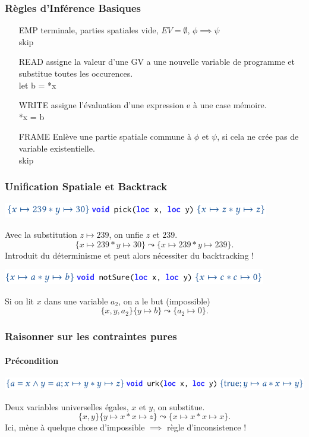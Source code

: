 \documentclass[french]{beamer}
\begin{document}
\begin{frame}
	\frametitle{Règles d'Inférence Basiques}
	\begin{itemize}
		\item[EMP] terminale, parties spatiales vide, $EV = \emptyset$, $\phi \implies \psi$ \\ skip
		\item[READ] assigne la valeur d'une GV a une nouvelle variable de programme et substitue toutes les occurences.\\
		let b = *x
		\item[WRITE] assigne l'évaluation d'une expression e à une case mémoire.\\
		*x = b 
		\item[FRAME] Enlève une partie spatiale commune à $\phi$ et $\psi$, si cela ne crée pas de variable existentielle.\\
		skip
	\end{itemize}
\end{frame}
\begin{frame}[fragile]
	\frametitle{Unification Spatiale et Backtrack}
   \includegraphics[height=\baselineskip]{figures/spatial_unification.png}
   
   Avec la substitution $z \mapsto 239$, on unfie $z$ et $239$. 
   \[ 
      \{x \mapsto 239 * y \mapsto 30\} \leadsto \{x \mapsto 239 * y \mapsto 239\}.
   \]
   Introduit du déterminisme et peut alors nécessiter du backtracking !
   
   \includegraphics[height=\baselineskip]{figures/backtrack.png}
   
   Si on lit $x$ dans une variable $a_2$, on a le but (impossible)
   \[
      \{x, y, a_2\}\{y \mapsto b\} \leadsto \{a_2 \mapsto 0\}.
   \]
\end{frame}
\begin{frame}[fragile]
	\frametitle{Raisonner sur les contraintes pures}
   \framesubtitle{Précondition}
   \includegraphics[width=\linewidth]{figures/precondition.png}
   
   Deux variables universelles égales, $x$ et $y$, on substitue.
   \[
      \{x, y\}\{y \mapsto x * x\mapsto z\} \leadsto \{x \mapsto x * x \mapsto x\}.
   \]
   Ici, mène à quelque chose d'impossible $\implies$ règle d'inconsistence ! 
\end{frame}
\end{document}
